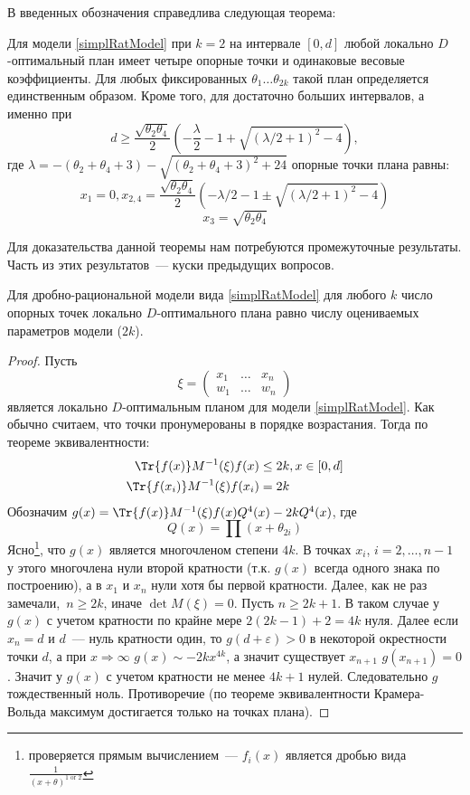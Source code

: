 В введенных обозначения справедлива следующая теорема:
\begin{thm}
Для модели \eqref{simplRatModel} при $k=2$ на интервале $[0,d]$ любой локально $D$-оптимальный план имеет четыре опорные точки и одинаковые весовые коэффициенты. Для любых фиксированных $\theta_1…\theta_{2k}$ такой план определяется единственным образом. Кроме того, для достаточно больших интервалов, а именно при 
$$ d \geq \frac{\sqrt{\theta_2\theta_4}}{2}\left(-\frac{\lambda}{2}-1+\sqrt{(\lambda/2 +1)^2 - 4}\right), $$
где $\lambda = -(\theta_2 + \theta_4 + 3) - \sqrt{(\theta_2+\theta_4+3)^2 + 24}$
опорные точки плана равны:
$$ x_1 = 0, x_{2,4} = \frac{\sqrt{\theta_2\theta_4}}{2} \left(-\lambda / 2 - 1 ± \sqrt{(\lambda /2 + 1)^2-4}\right)$$
$$x_3 = \sqrt{\theta_2\theta_4}$$
\end{thm}


Для доказательства данной теоремы нам потребуются промежуточные результаты. Часть из этих результатов — куски предыдущих вопросов. 

\begin{thm}
\label{rationalParamCountThm}
Для дробно-рациональной модели вида \eqref{simplRatModel} для любого $k$ число опорных точек локально $D$-оптимального плана равно числу оцениваемых параметров модели ($2k$).
\end{thm}
\begin{proof}
Пусть 
$$\xi = \begin{pmatrix} x_1 & … & x_n \\ w_1 & … & w_n \end{pmatrix}$$
является локально $D$-оптимальным планом для модели \eqref{simplRatModel}. Как обычно считаем, что точки пронумерованы в порядке возрастания. Тогда по теореме эквивалентности:
\begin{equation}
\begin{split}
\Tr{f(x)}M^{-1}(\xi)f(x) &\leq 2k, x\in[0,d] \\
\Tr{f(x_i)}M^{-1}(\xi)f(x_i) & = 2k
\end{split}
\end{equation}
Обозначим $g(x) = \Tr{f(x)}M^{-1}(\xi)f(x) Q^{4}(x) - 2k Q^{4}(x)$, где 
$$Q(x) = \prod (x+ \theta_{2i})$$
Ясно\footnote{проверяется прямым вычислением — $f_i(x)$ является дробью вида 
$\frac{1}{(x+\theta)^{1 \text{ or } 2}}$}, что $g(x)$ является многочленом степени $4k$. В точках $x_i$, $i=2, …, n - 1$ у этого многочлена нули второй кратности (т.к. $g(x)$ всегда одного знака по построению), а в $x_1$ и $x_{n}$ нули хотя бы первой кратности. 
Далее, как не раз замечали, $n \geq 2k$, иначе $\det M(\xi) = 0$. 
Пусть $n \geq 2k+1$. В таком случае у $g(x)$ с учетом кратности по крайне мере $2(2k-1) +2 = 4k$ нуля. Далее
если $x_n = d$ и $d$ — нуль кратности один, то $g(d+\varepsilon) > 0$ в некоторой окрестности точки $d$, а при 
$x\Rightarrow \infty$ $g(x) \sim -2kx^{4k}$, а значит существует $x_{n+1}$ $g(x_{n+1}) = 0$. Значит у $g(x)$ с учетом кратности не менее $4k+1$ нулей. Следовательно $g$ тождественный ноль. Противоречие (по теореме эквивалентности Крамера-Вольда максимум достигается только на точках плана). 
\end{proof}


